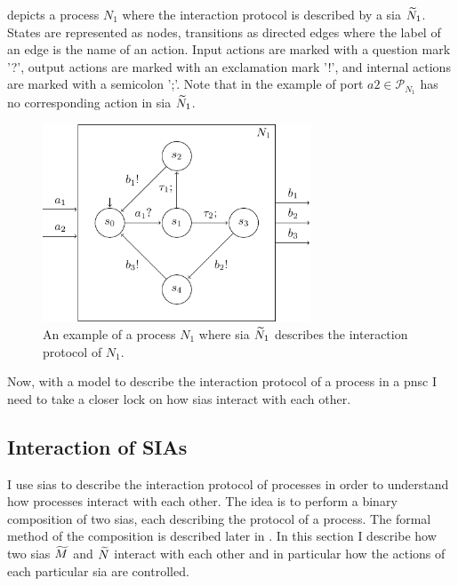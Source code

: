 \Fig{\ref{fig_sia}} depicts a process $N_1$ where the interaction protocol is described by a \gls{sia} $\widetilde{N}_1$.
States are represented as nodes, transitions as directed edges where the label of an edge is the name of an action.
Input actions are marked with a question mark '?', output actions are marked with an exclamation mark '!', and internal actions are marked with a semicolon ';'.
Note that in the example of \Fig{\ref{fig_sia}} port $a2 \in \mathcal{P}_{N_1}$ has no corresponding action in \gls{sia} $\widetilde{N}_1$.
\begin{figure}[bht]
    \TopFigSpace
    \centering
    \includegraphics[width=8cm]{fig/sia.pdf}
    \CaptionFigSpace
    \caption{An example of a process $N_1$ where \gls{sia} $\widetilde{N}_1$ describes the interaction protocol of $N_1$.}
    \label{fig_sia}
    \BotFigSpace
\end{figure}

Now, with a model to describe the interaction protocol of a process in a \gls{pnsc} I need to take a closer lock on how \glspl{sia} interact with each other.

\subsection{Interaction of SIAs}
\label{sect_sia_interaction}
I use \glspl{sia} to describe the interaction protocol of processes in order to understand how processes interact with each other.
The idea is to perform a binary composition of two \glspl{sia}, each describing the protocol of a process.
The formal method of the composition is described later in \Sect{\ref{sect_sia_composition}}.
In this section I describe how two \glspl{sia} $\widetilde{M}$ and $\widetilde{N}$ interact with each other and in particular how the actions of each particular \gls{sia} are controlled.

